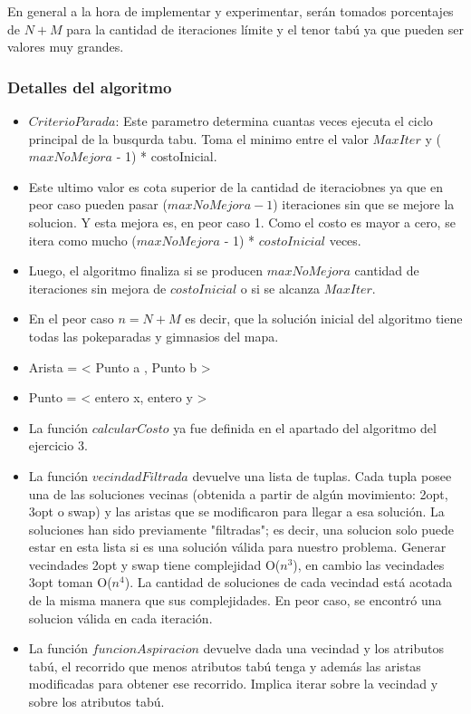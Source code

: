 En general a la hora de implementar y experimentar, serán tomados porcentajes de $N+M$ para la cantidad de iteraciones límite y el tenor tabú ya que pueden ser valores muy grandes.\\

\subsubsection*{Detalles del algoritmo}

\begin{itemize}
Justificación de la cota de complejidad del ciclo principal:
\item $CriterioParada$: Este parametro determina cuantas veces ejecuta el ciclo principal de la busqurda tabu. Toma el minimo entre el valor $MaxIter$ y ($maxNoMejora$ - 1) * costoInicial.
\item Este ultimo valor es cota superior de la cantidad de iteraciobnes ya que en peor caso pueden pasar ($maxNoMejora - 1$) iteraciones sin que se mejore la solucion. Y esta mejora es, en peor caso 1. Como el costo es mayor a cero, se itera como mucho ($maxNoMejora$ - 1) * $costoInicial$ veces.
\item Luego, el algoritmo finaliza si se producen $maxNoMejora$ cantidad de iteraciones sin mejora de $costoInicial$ o si se alcanza $MaxIter$. 
\item En el peor caso $n = N+M$ es decir, que la solución inicial del algoritmo tiene todas las pokeparadas y gimnasios del mapa.
\item Arista = < Punto a , Punto b >
\item Punto = < entero x, entero y >
\item La función $calcularCosto$ ya fue definida en el apartado del algoritmo del ejercicio 3.
\item La función $vecindadFiltrada$ devuelve una lista de tuplas. Cada tupla posee una de las soluciones vecinas (obtenida a partir de algún movimiento: 2opt, 3opt o swap) y las aristas que se modificaron para llegar a esa solución. La soluciones han sido previamente "filtradas"; es decir, una solucion solo puede estar en esta lista si es una solución válida para nuestro problema. Generar vecindades 2opt y swap tiene complejidad O($n^3$), en cambio las vecindades 3opt toman O($n^4$).
	La cantidad de soluciones de cada vecindad está acotada de la misma manera que sus complejidades. En peor caso, se encontró una solucion válida en cada iteraci\'on.
\item La función $funcionAspiracion$ devuelve dada una vecindad y los atributos tabú, el recorrido que menos atributos tabú tenga y además las aristas modificadas para obtener ese recorrido. Implica iterar sobre la vecindad y sobre los atributos tabú. 

\end{itemize}
